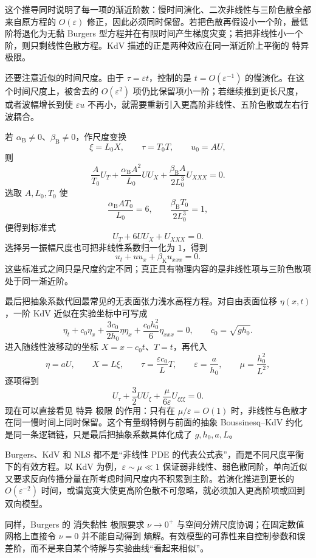 这个推导同时说明了每一项的渐近阶数：慢时间演化、二次非线性与三阶色散全部来自原方程的 $O(\varepsilon)$ 修正，因此必须同时保留。若把色散再假设小一个阶，最低阶将退化为无黏 Burgers 型方程并在有限时间产生梯度灾变；若把非线性小一个阶，则只剩线性色散方程。KdV 描述的正是两种效应在同一渐近阶上平衡的 特异 极限。

还要注意近似的时间尺度。由于 $\tau=\varepsilon t$，控制的是 $t=O(\varepsilon^{-1})$ 的慢演化。在这个时间尺度上，被舍去的 $O(\varepsilon^2)$ 项仍比保留项小一阶；若继续推到更长尺度，或者波幅增长到使 $\varepsilon u$ 不再小，就需要重新引入更高阶非线性、五阶色散或左右行波耦合。

若 $\alpha_{\mathrm B}\ne0$、$\beta_{\mathrm B}\ne0$，作尺度变换
\[
\xi=L_0X,
\qquad \tau=T_0T,
\qquad u_0=AU,
\]
则
\[
\frac{A}{T_0}U_T+\frac{\alpha_{\mathrm B}A^2}{L_0}UU_X
+\frac{\beta_{\mathrm B}A}{2L_0^3}U_{XXX}=0.
\]
选取 $A,L_0,T_0$ 使
\[
\frac{\alpha_{\mathrm B}AT_0}{L_0}=6,
\qquad
\frac{\beta_{\mathrm B}T_0}{2L_0^3}=1,
\]
便得到标准式
\[
U_T+6UU_X+U_{XXX}=0.
\]
选择另一振幅尺度也可把非线性系数归一化为 $1$，得到
\[
u_t+uu_x+\beta_{\mathrm K}u_{xxx}=0.
\]
这些标准式之间只是尺度约定不同；真正具有物理内容的是非线性项与三阶色散项处于同一渐近阶。

最后把抽象系数代回最常见的无表面张力浅水高程方程。对自由表面位移 $\eta(x,t)$，一阶 KdV 近似在实验坐标中可写成
\begin{equation*}{
\eta_t+c_0\eta_x+\frac{3c_0}{2h_0}\eta\eta_x
+\frac{c_0h_0^2}{6}\eta_{xxx}=0,
\qquad c_0=\sqrt{gh_0}
}.\end{equation*}
进入随线性波移动的坐标 $X=x-c_0t$、$T=t$，再代入
\[
\eta=aU,
\qquad X=L\xi,
\qquad \tau=\frac{\varepsilon c_0}{L}T,
\qquad
\varepsilon=\frac{a}{h_0},
\qquad
\mu=\frac{h_0^2}{L^2},
\]
逐项得到
\[
U_\tau+\frac32UU_\xi+\frac{\mu}{6\varepsilon}U_{\xi\xi\xi}=0.
\]
现在可以直接看见 特异 极限 的作用：只有在 $\mu/\varepsilon=O(1)$ 时，非线性与色散才在同一慢时间上同时保留。这个有量纲特例与前面的抽象 Boussinesq--KdV 约化是同一条逻辑链，只是最后把抽象系数具体化成了 $g,h_0,a,L$。

Burgers、KdV 和 NLS 都不是“非线性 PDE 的代表公式表”，而是不同尺度平衡下的有效方程。以 KdV 为例，$\varepsilon\sim\mu\ll1$ 保证弱非线性、弱色散同阶，单向近似又要求反向传播分量在所考虑时间尺度内不积累到主阶。若演化推进到更长的 $O(\varepsilon^{-2})$ 时间，或谱宽变大使更高阶色散不可忽略，就必须加入更高阶项或回到双向模型。

同样，Burgers 的 消失黏性 极限要求 $\nu\to0^+$ 与空间分辨尺度协调；在固定数值网格上直接令 $\nu=0$ 并不能自动得到 熵解。有效模型的可靠性来自控制参数和误差阶，而不是来自某个特解与实验曲线“看起来相似”。

